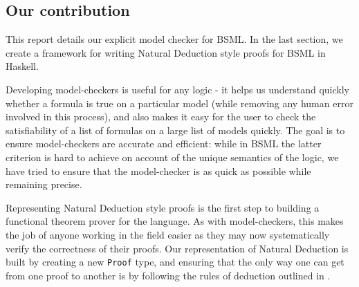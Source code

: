 \subsection{Our contribution}

This report details our explicit model checker for BSML. In the last section, we create a framework for writing Natural Deduction style
proofs for BSML in Haskell. 

Developing model-checkers is useful for any logic - it helps us understand quickly whether a formula is true on a particular model (while removing any human 
error involved in this process), and also makes it easy for the user to check the satisfiability of a list of formulas on a large list of models quickly. 
The goal is to ensure model-checkers are accurate and efficient: while in BSML the latter criterion is hard to achieve on account of the unique 
semantics of the logic, we have tried to ensure that the model-checker is as quick as possible while remaining precise.

Representing Natural Deduction style proofs is the first step to building a functional theorem prover for the language. As with model-checkers, this makes the 
job of anyone working in the field easier as they may now systematically verify the correctness of their proofs. Our representation of Natural Deduction is built by creating a new \verb|Proof| type, and ensuring that the only 
way one can get from one proof to another is by following the rules of deduction outlined in \cite{Aloni2024}.
